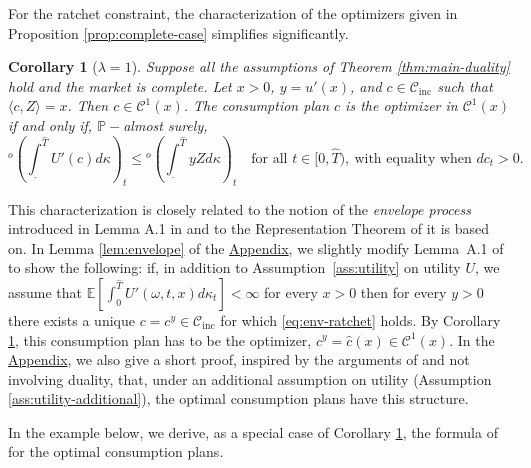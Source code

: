\documentclass[11pt, oneside]{article}   	%
\theoremstyle{plain}
\newtheorem{cor}[thm]{Corollary}
\theoremstyle{definition}
\theoremstyle{remark}
\begin{document}
For the ratchet constraint, the characterization of the optimizers given in Proposition \ref{prop:complete-case} simplifies significantly.
\begin{cor}[$\lambda=1$]\label{cor:complete-env}
Suppose all the assumptions of Theorem \ref{thm:main-duality} hold and the market is complete. Let $x>0$, $y=u'(x)$, and $c\in\mathcal{C}_{\text{inc}}$ such that $\langle c,Z \rangle=x$. Then $c\in\mathcal{C}^1(x)$. The consumption plan $c$ is the optimizer in $\mathcal{C}^1(x)$ if and only if, $\mathbb{P}-$almost surely,
\begin{equation}\label{eq:env-ratchet}
^o\left(\int_.^{\hat{T}} U'(c)d\kappa\right)_t\leq{}^o\left(\int_.^{\hat{T}} yZ d\kappa\right)_t\quad\text{for all }t\in[0,{\hat{T}}),\ \text{with equality when }dc_t>0.
\end{equation}
\end{cor}
This characterization is closely related to the notion of the \textit{envelope process} introduced in Lemma A.1 in \cite{BK} and to the Representation Theorem of \cite{bank-el-karoui} it is based on. In Lemma \ref{lem:envelope} of the \hyperref[app:envelope]{Appendix}, we slightly modify Lemma~A.1 of \cite{BK} to show the following: if, in addition to Assumption~\ref{ass:utility} on utility $U$, we assume that $\mathbb{E}\left[\int_0^{\hat{T}}U'(\omega,t,x)d\kappa_t\right]<\infty$ for every $x>0$ then for every $y>0$ there exists a unique $c=c^y\in\mathcal{C}_\text{inc}$ for which \eqref{eq:env-ratchet} holds. By Corollary \ref{cor:complete-env}, this consumption plan has to be the optimizer, $c^y=\hat{c}(x)\in\mathcal{C}^1(x)$. In the \hyperref[app:envelope]{Appendix}, we also give a short proof, inspired by the arguments of \cite{riedel} and not involving duality, that, under an additional assumption on utility (Assumption \ref{ass:utility-additional}), the optimal consumption plans have this structure.

In the example below, we derive, as a special case of Corollary \ref{cor:complete-env}, the formula of \cite{riedel} for the optimal consumption plans.
\end{document}
